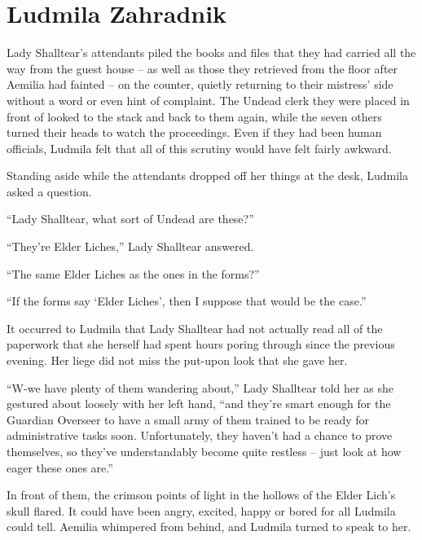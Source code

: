 \chapter{Ludmila Zahradnik}

Lady Shalltear’s attendants piled the books and files that they had carried all the way from the guest house – as well as those they retrieved from the floor after Aemilia had fainted – on the counter, quietly returning to their mistress’ side without a word or even hint of complaint. The Undead clerk they were placed in front of looked to the stack and back to them again, while the seven others turned their heads to watch the proceedings. Even if they had been human officials, Ludmila felt that all of this scrutiny would have felt fairly awkward.

 

Standing aside while the attendants dropped off her things at the desk, Ludmila asked a question.

 

“Lady Shalltear, what sort of Undead are these?”

 

“They’re Elder Liches,” Lady Shalltear answered.

 

“The same Elder Liches as the ones in the forms?”

 

“If the forms say ‘Elder Liches’, then I suppose that would be the case.”

 

It occurred to Ludmila that Lady Shalltear had not actually read all of the paperwork that she herself had spent hours poring through since the previous evening. Her liege did not miss the put-upon look that she gave her.

 

“W-we have plenty of them wandering about,” Lady Shalltear told her as she gestured about loosely with her left hand, “and they’re smart enough for the Guardian Overseer to have a small army of them trained to be ready for administrative tasks soon. Unfortunately, they haven’t had a chance to prove themselves, so they’ve understandably become quite restless – just look at how eager these ones are.”

 

In front of them, the crimson points of light in the hollows of the Elder Lich’s skull flared. It could have been angry, excited, happy or bored for all Ludmila could tell. Aemilia whimpered from behind, and Ludmila turned to speak to her.

